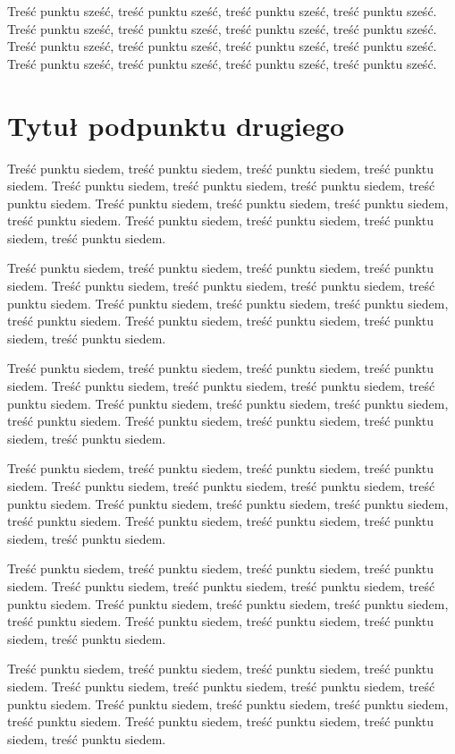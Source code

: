 \documentclass[brudnopis,xodstep]{wkmgr}
\begin{document}
Treść punktu sześć, treść punktu sześć, treść punktu sześć, treść punktu sześć.
Treść punktu sześć, treść punktu sześć, treść punktu sześć, treść punktu sześć.
Treść punktu sześć, treść punktu sześć, treść punktu sześć, treść punktu sześć.
Treść punktu sześć, treść punktu sześć, treść punktu sześć, treść punktu sześć.


\section{Tytuł podpunktu drugiego}

Treść punktu siedem, treść punktu siedem, treść punktu siedem, treść punktu siedem.
Treść punktu siedem, treść punktu siedem, treść punktu siedem, treść punktu siedem.
Treść punktu siedem, treść punktu siedem, treść punktu siedem, treść punktu siedem.
Treść punktu siedem, treść punktu siedem, treść punktu siedem, treść punktu siedem.

Treść punktu siedem, treść punktu siedem, treść punktu siedem, treść punktu siedem.
Treść punktu siedem, treść punktu siedem, treść punktu siedem, treść punktu siedem.
Treść punktu siedem, treść punktu siedem, treść punktu siedem, treść punktu siedem.
Treść punktu siedem, treść punktu siedem, treść punktu siedem, treść punktu siedem.

Treść punktu siedem, treść punktu siedem, treść punktu siedem, treść punktu siedem.
Treść punktu siedem, treść punktu siedem, treść punktu siedem, treść punktu siedem.
Treść punktu siedem, treść punktu siedem, treść punktu siedem, treść punktu siedem.
Treść punktu siedem, treść punktu siedem, treść punktu siedem, treść punktu siedem.

Treść punktu siedem, treść punktu siedem, treść punktu siedem, treść punktu siedem.
Treść punktu siedem, treść punktu siedem, treść punktu siedem, treść punktu siedem.
Treść punktu siedem, treść punktu siedem, treść punktu siedem, treść punktu siedem.
Treść punktu siedem, treść punktu siedem, treść punktu siedem, treść punktu siedem.

Treść punktu siedem, treść punktu siedem, treść punktu siedem, treść punktu siedem.
Treść punktu siedem, treść punktu siedem, treść punktu siedem, treść punktu siedem.
Treść punktu siedem, treść punktu siedem, treść punktu siedem, treść punktu siedem.
Treść punktu siedem, treść punktu siedem, treść punktu siedem, treść punktu siedem.

Treść punktu siedem, treść punktu siedem, treść punktu siedem, treść punktu siedem.
Treść punktu siedem, treść punktu siedem, treść punktu siedem, treść punktu siedem.
Treść punktu siedem, treść punktu siedem, treść punktu siedem, treść punktu siedem.
Treść punktu siedem, treść punktu siedem, treść punktu siedem, treść punktu siedem.
\end{document}
